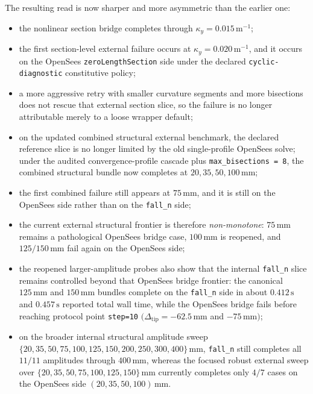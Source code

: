 The resulting read is now sharper and more asymmetric than the earlier one:
\begin{itemize}
  \item the nonlinear section bridge completes through
    \(\kappa_y = 0.015\,\mathrm{m}^{-1}\);
  \item the first section-level external failure occurs at
    \(\kappa_y = 0.020\,\mathrm{m}^{-1}\), and it occurs on the OpenSees
    \texttt{zeroLengthSection} side under the declared
    \texttt{cyclic-diagnostic} constitutive policy;
  \item a more aggressive retry with smaller curvature segments and more
    bisections does not rescue that external section slice, so the failure is
    no longer attributable merely to a loose wrapper default;
  \item on the updated combined structural external benchmark, the declared
    reference slice is no longer limited by the old single-profile OpenSees
    solve; under the audited convergence-profile cascade plus
    \texttt{max\_bisections = 8}, the combined structural bundle now completes
    at \(20,35,50,100\,\mathrm{mm}\);
  \item the first combined failure still appears at \(75\,\mathrm{mm}\), and
    it is still on the OpenSees side rather than on the \texttt{fall\_n}
    side;
  \item the current external structural frontier is therefore
    \emph{non-monotone}: \(75\,\mathrm{mm}\) remains a pathological OpenSees
    bridge case, \(100\,\mathrm{mm}\) is reopened, and
    \(125/150\,\mathrm{mm}\) fail again on the OpenSees side;
  \item the reopened larger-amplitude probes also show that the internal
    \texttt{fall\_n} slice remains controlled beyond that OpenSees bridge
    frontier: the canonical \(125\,\mathrm{mm}\) and \(150\,\mathrm{mm}\)
    bundles complete on the \texttt{fall\_n} side in about
    \(0.412\,\mathrm{s}\) and \(0.457\,\mathrm{s}\) reported total wall time,
    while the OpenSees bridge fails before reaching protocol point
    \texttt{step=10} \((\Delta_\mathrm{tip}=-62.5\,\mathrm{mm}\) and
    \(-75\,\mathrm{mm})\);
  \item on the broader internal structural amplitude sweep
    \(\{20,35,50,75,100,125,150,200,250,300,400\}\,\mathrm{mm}\),
    \texttt{fall\_n} still completes all \(11/11\) amplitudes through
    \(400\,\mathrm{mm}\), whereas the focused robust external sweep over
    \(\{20,35,50,75,100,125,150\}\,\mathrm{mm}\) currently completes only
    \(4/7\) cases on the OpenSees side \((20,35,50,100)\,\mathrm{mm}\).
\end{itemize}

